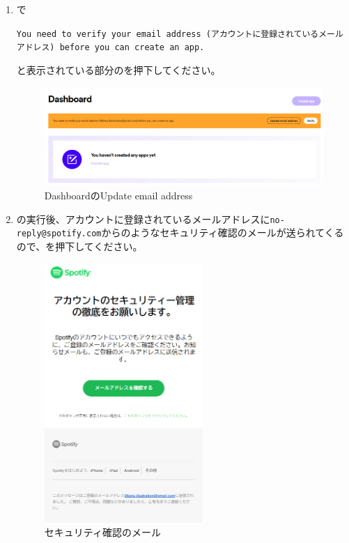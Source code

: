 \begin{enumerate}
                \item \spotifydashboard で
                    \begin{screen}
                        \texttt{You need to verify your email address (アカウントに登録されているメールアドレス) before you can create an app.}
                    \end{screen}
                    と表示されている部分のを押下してください。
                \label{item:spotify3}
                    \begin{figure}[htbp]
                        \centering
                        \includegraphics[width=\linewidth]{./pictures/spotify2.png}
                        \caption{DashboardのUpdate email address}
                        \label{img:spotify2}
                    \end{figure}

                \newpage
                \item {}の実行後、アカウントに登録されているメールアドレスに\texttt{no-reply@spotify.com}からのようなセキュリティ確認のメールが送られてくるので、を押下してください。
                \label{item:spotify4}
                    \begin{figure}[htbp]
                        \centering
                        \includegraphics[width=6cm]{./pictures/Spotify3.png}
                        \caption{セキュリティ確認のメール}
                        \label{img:spotify3}
                    \end{figure}


\end{enumerate}
